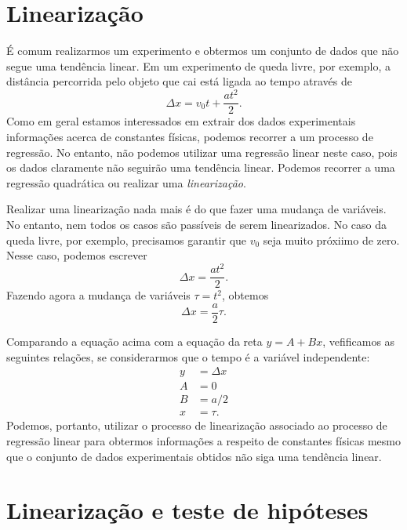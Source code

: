 \section{Linearização}

É comum realizarmos um experimento e obtermos um conjunto de dados que não segue uma tendência linear. Em um experimento de queda livre, por exemplo, a distância percorrida pelo objeto que cai está ligada ao tempo através de
\begin{equation}
	\Delta x = v_0 t + \frac{at^2}{2}.
\end{equation}
%
Como em geral estamos interessados em extrair dos dados experimentais informações acerca de constantes físicas, podemos recorrer a um processo de regressão. No entanto, não podemos utilizar uma regressão linear neste caso, pois os dados claramente não seguirão uma tendência linear. Podemos recorrer a uma regressão quadrática ou realizar uma \emph{linearização}.

Realizar uma linearização nada mais é do que fazer uma mudança de variáveis. No entanto, nem todos os casos são passíveis de serem linearizados. No caso da queda livre, por exemplo, precisamos garantir que $v_0$ seja muito próxiimo de zero. Nesse caso, podemos escrever
\begin{equation}
	\Delta x = \frac{at^2}{2}.
\end{equation}
%
Fazendo agora a mudança de variáveis $\tau = t^2$, obtemos
\begin{equation}
	\Delta x = \frac{a}{2}\tau.
\end{equation}

Comparando a equação acima com a equação da reta $y = A + Bx$, vefificamos as seguintes relações, se considerarmos que o tempo é a variável independente:
\begin{align}
	y &= \Delta x \\
	A &= 0 \\
	B &= a/2 \\
	x &= \tau.
\end{align}
%
Podemos, portanto, utilizar o processo de linearização associado ao processo de regressão linear para obtermos informações a respeito de constantes físicas mesmo que o conjunto de dados experimentais obtidos não siga uma tendência linear.

\section{Linearização e teste de hipóteses}

